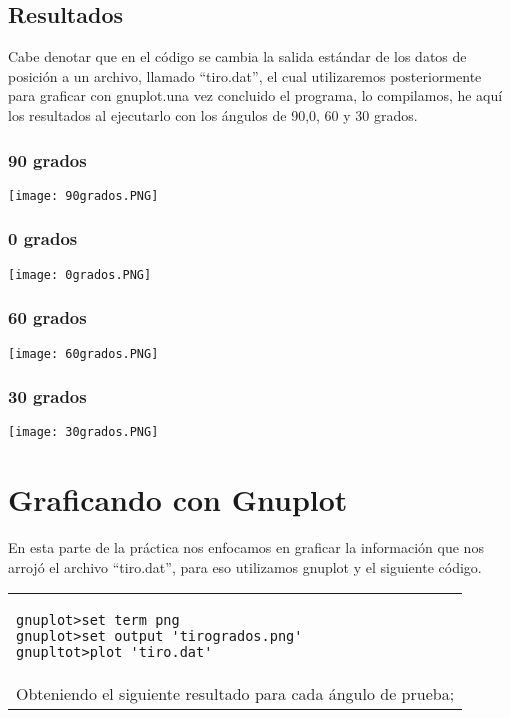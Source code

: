 \documentclass[10pt]{article}
\begin{document}
\subsection{Resultados}
Cabe denotar que en el código se cambia la salida estándar de los datos de posición a un archivo, llamado ``tiro.dat'', el cual utilizaremos posteriormente para graficar con gnuplot.una vez concluido el programa, lo compilamos, he aquí los resultados al ejecutarlo con los ángulos de 90,0, 60 y 30 grados.
\subsubsection{90 grados}
\begin{center}
\texttt{[image: 90grados.PNG]}
\end{center}
\subsubsection{0 grados}
\begin{center}
\texttt{[image: 0grados.PNG]}
\end{center}
\subsubsection{60 grados}
\begin{center}
\texttt{[image: 60grados.PNG]}
\end{center}
\subsubsection{30 grados}
\begin{center}
\texttt{[image: 30grados.PNG]}
\end{center}
\newpage
\section{Graficando con Gnuplot}
En esta parte de la práctica nos enfocamos en graficar la información que nos arrojó el archivo ``tiro.dat'', para eso utilizamos gnuplot y el siguiente código.
\begin{tabular}{l}
\begin{verbatim}
gnuplot>set term png
gnuplot>set output 'tirogrados.png'
gnupltot>plot 'tiro.dat'
\end{verbatim}\\
Obteniendo el siguiente resultado para cada ángulo de prueba;
\end{tabular}
\end{document}
